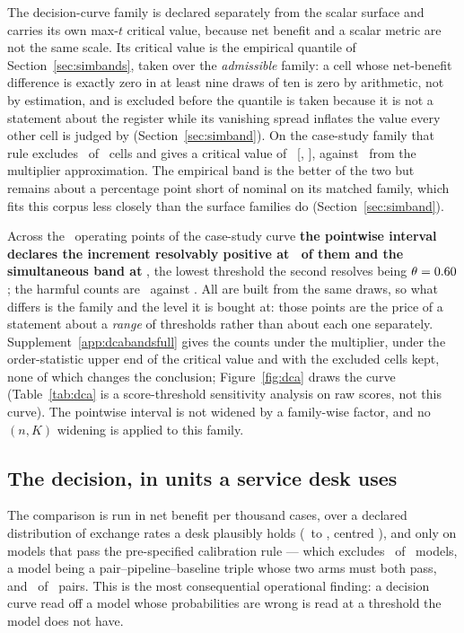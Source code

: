 \documentclass[11pt,3p,review,authoryear]{elsarticle}
\theoremstyle{definition}
\begin{document}
The decision-curve family is declared separately from the scalar surface and
carries its own max\nobreakdash-$t$ critical value, because net benefit and a scalar
metric are not the same scale. Its critical value is the empirical
quantile of Section~\ref{sec:simbands}, taken over the \emph{admissible}
family: a cell whose net-benefit difference is exactly zero in at least nine
draws of ten is zero by arithmetic, not by estimation, and is excluded before
the quantile is taken because it is not a statement about the register while
its vanishing spread inflates the value every other cell is judged by
(Section~\ref{sec:simband}). On the case-study family that rule excludes
\nDcaCellsExcludedDegenerate\ of \nDcaFamily\ cells and gives a critical
value of \dcaQEmp\ [\dcaQEmpLo, \dcaQEmpHi], against \dcaQ\ from the
multiplier approximation. The empirical band is the better of the two but
remains about a percentage point short of nominal on its matched family,
which fits this corpus less closely than the surface families do
(Section~\ref{sec:simband}).

Across the \nDcGrid\ operating points of the case-study curve \textbf{the
pointwise interval declares the increment resolvably positive at
\nBeneficialPointwise\ of them and the simultaneous band at
\nBeneficialSimultaneousEmp}, the lowest threshold the second resolves
being $\theta = 0.60$; the harmful counts are
\nHarmfulPointwise\ against \nHarmfulSimultaneousEmp. All are built from the
same draws, so what differs is the family and the level it is bought at:
those points are the price of a statement about a \emph{range} of thresholds
rather than about each one separately. Supplement~\ref{app:dcabandsfull}
gives the counts under the multiplier, under the order-statistic upper end of
the critical value and with the excluded cells kept, none of which changes
the conclusion; Figure~\ref{fig:dca} draws the curve (Table~\ref{tab:dca} is
a score-threshold sensitivity analysis on raw scores, not this curve). The
pointwise interval is not widened by a family-wise factor, and no $(n,K)$
widening is applied to this family.

\subsection{The decision, in units a service desk uses}
\label{sec:nbregret}

The comparison is run in net benefit per thousand cases, over a declared
distribution of exchange rates a desk plausibly holds
(\deskQlo\ to \deskQhi, centred \deskQmid), and only on models that pass the
pre-specified calibration rule --- which excludes \nModelsDcaExcluded\ of
\nModelsDca\ models, a model being a pair--pipeline--baseline triple whose
two arms must both pass, and \nPairsDcaExcluded\ of \nPairs\ pairs.
This is the most consequential operational finding: a decision curve read off
a model whose probabilities are wrong is read at a threshold the model does
not have.
\end{document}
